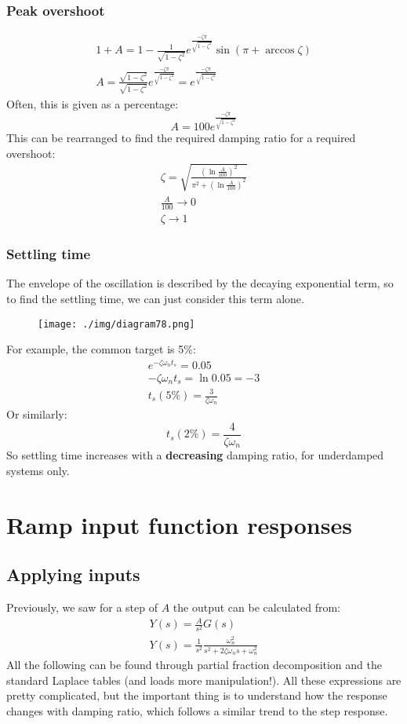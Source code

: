 \subsubsection{Peak overshoot}
\begin{gather}
  1 + A = 1 - \frac{1}{\sqrt{1 - \zeta^2}} e^{\frac{-\zeta \pi}{\sqrt{1-\zeta^2}}}\sin{\left(\pi + \arccos{\zeta}\right)}\\[10pt]
  A = \frac{\sqrt{1-\zeta^2}}{\sqrt{1-\zeta^2}} e^{\frac{-\zeta \pi}{\sqrt{1-\zeta^2}}} = e^{\frac{-\zeta \pi}{\sqrt{1-\zeta^2}}}
\end{gather}
Often, this is given as a percentage:
\begin{equation}
  A = 100 e^{\frac{-\zeta \pi}{\sqrt{1-\zeta^2}}}
\end{equation}
This can be rearranged to find the required damping ratio for a required overshoot:
\begin{gather}
  \zeta = \sqrt{\frac{\left(\ln{\frac{A}{100}}\right)^2}{\pi^2 + \left(\ln{\frac{A}{100}}\right)^2}}\\
  \frac{A}{100} \rightarrow 0\\
  \zeta \rightarrow 1
\end{gather}
\subsubsection{Settling time}
The envelope of the oscillation is described by the decaying exponential term, so to find the settling time, we can just consider this term alone.
\begin{figure}[H]
  \centering
  \texttt{[image: ./img/diagram78.png]}
\end{figure}
For example, the common target is 5\%:
\begin{gather}
  e^{-\zeta \omega_n t_s} = 0.05\\
  -\zeta \omega_n t_s = \ln{0.05} = -3\\
  t_s (5\%) = \frac{3}{\zeta \omega_n}
\end{gather}
Or similarly:
\begin{equation}
  t_s (2\%) = \frac{4}{\zeta \omega_n}
\end{equation}
So settling time increases with a \textbf{decreasing} damping ratio, for underdamped systems only.
\section{Ramp input function responses}
\subsection{Applying inputs}
Previously, we saw for a step of $A$ the output can be calculated from:
\begin{gather}
  Y(s) = \frac{A}{s^2} G(s)\\
  Y(s) = \frac{1}{s^2} \frac{\omega_n^2}{s^2 + 2\zeta \omega_n s + \omega_n^2}
\end{gather}
All the following can be found through partial fraction decomposition and the standard Laplace tables (and loads more manipulation!). All these expressions are pretty complicated, but the important thing is to understand how the response changes with damping ratio, which follows a similar trend to the step response.
